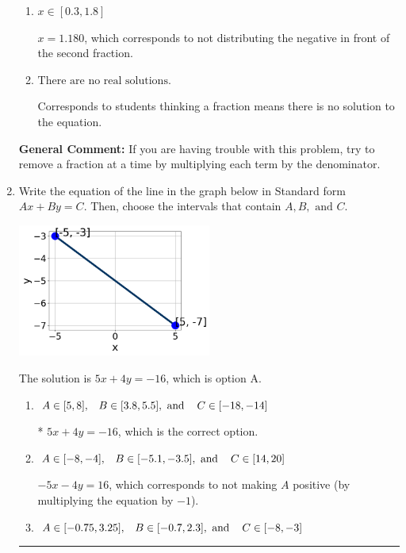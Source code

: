 \documentclass{extbook}[14pt]
\newcommand{\litem}[1]{\item #1

\rule{\textwidth}{0.4pt}}
\begin{document}
\begin{enumerate}
{\begin{enumerate}[label=\Alph*.]
 $x = -11.955$, which corresponds to dividing the coefficients in front of x by the denominator rather than dividing BOTH parts of the numerator by the denominator (or removing the fractions through multiplication).
\item \( x \in [0.3, 1.8] \)

 $x = 1.180$, which corresponds to not distributing the negative in front of the second fraction.
\item \( \text{There are no real solutions.} \)

Corresponds to students thinking a fraction means there is no solution to the equation.
\end{enumerate}

\textbf{General Comment:} If you are having trouble with this problem, try to remove a fraction at a time by multiplying each term by the denominator.
}
\litem{
Write the equation of the line in the graph below in Standard form $Ax+By=C$. Then, choose the intervals that contain $A, B, \text{ and } C$.

\begin{center}
    \includegraphics[width=0.5\textwidth]{../Figures/linearGraphToStandardA.png}
\end{center}



The solution is \( 5x + 4y = -16 \), which is option A.\begin{enumerate}[label=\Alph*.]
\item \( A \in [5, 8], \hspace{3mm} B \in [3.8, 5.5], \text{ and } \hspace{3mm} C \in [-18, -14] \)

* $5x + 4y = -16$, which is the correct option.
\item \( A \in [-8, -4], \hspace{3mm} B \in [-5.1, -3.5], \text{ and } \hspace{3mm} C \in [14, 20] \)

 $-5x - 4y = 16$, which corresponds to not making $A$ positive (by multiplying the equation by $-1$).
\item \( A \in [-0.75, 3.25], \hspace{3mm} B \in [-0.7, 2.3], \text{ and } \hspace{3mm} C \in [-8, -3] \)


\end{enumerate}}
\end{enumerate}
\end{document}
